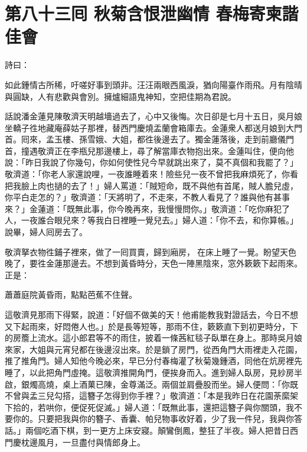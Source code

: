 
\chapter*{第八十三囘 秋菊含恨泄幽情 春梅寄柬諧佳會}


詩曰：

如此鍾情古所稀，吁嗟好事到頭非。汪汪兩眼西風淚，猶向陽臺作雨飛。月有陰晴與圓缺，人有悲歡與會別。擁爐細語鬼神知，空把佳期為君說。

話說潘金蓮見陳敬濟天明越墻過去了，心中又後悔。{}次日卻是七月十五日，吳月娘坐轎子徃地藏庵薛姑子那裡，替西門慶燒盂蘭會箱庫去。金蓮衆人都送月娘到大門首。囘來，孟玉樓、孫雪娥、大姐，都徃後邊去了。獨金蓮落後，走到前廳儀門首，撞遇敬濟正在李瓶兒那邊樓上，尋了解當庫衣物抱出來。金蓮叫住，便向他說：「昨日我說了你幾句，你如何使性兒今早就跳出來了，莫不真個和我罷了？」敬濟道：「你老人家還說哩，一夜誰睡着來！險些兒一夜不曾把我麻煩死了，你看把我臉上肉也撾的去了！」婦人罵道：「賊短命，既不與他有首尾，賊人膽兒虛，你平白走怎的？」{}敬濟道：「天將明了，不走來，不教人看見了？誰與他有甚事來？」金蓮道：「既無此事，你今晚再來，我慢慢問你。」敬濟道：「吃你麻犯了人，一夜誰合眼兒來？等我白日裡睡一覺兒去。」婦人道：「你不去，和你算帳。」{}說畢，婦人囘房去了。

敬濟拏衣物徃鋪子裡來，做了一囘買賣，歸到廂房，𢱉在床上睡了一覺。盼望天色晚了，要徃金蓮那邊去。不想到黃昏時分，天色一陣黑陰來，窓外簌簌下起雨來。{}正是：

蕭蕭庭院黃昏雨，點點芭蕉不住聲。

這敬濟見那雨下得緊，說道：「好個不做美的天！他甫能教我對證話去，今日不想又下起雨來，好悶倦人也。」於是長等短等，那雨不住，簌簌直下到初更時分，下的房簷上流水。這小郎君等不的雨住，披着一條茜紅毯子臥單在身上。{}那時吳月娘來家，大姐與元宵兒都在後邊沒出來。於是鎖了房門，從西角門大雨裡走入花園，推了推角門。婦人知他今晚必來，早已分付春梅灌了秋菊幾鍾酒，同他在炕房裡先睡了，以此把角門虛掩。這敬濟推開角門，便挨身而入。進到婦人臥房，見紗房半啟，銀燭高燒，桌上酒菓已陳，金尊滿泛。兩個並肩疊股而坐。婦人便問：「你既不曾與孟三兒勾搭，這簪子怎得到你手裡？」敬濟道：「本是我昨日在花園荼縻架下拾的，若哄你，便促死促滅。」婦人道：「既無此事，還把這簪子與你關頭，{}我不要你的。只要把我與你的簪子、香囊、帕兒物事收好着，少了我一件兒，我與你答話。」兩個吃酒下棋，到一更方上床安寢。顛鸞倒鳳，整狂了半夜。婦人把昔日西門慶枕邊風月，一旦盡付與情郎身上。


